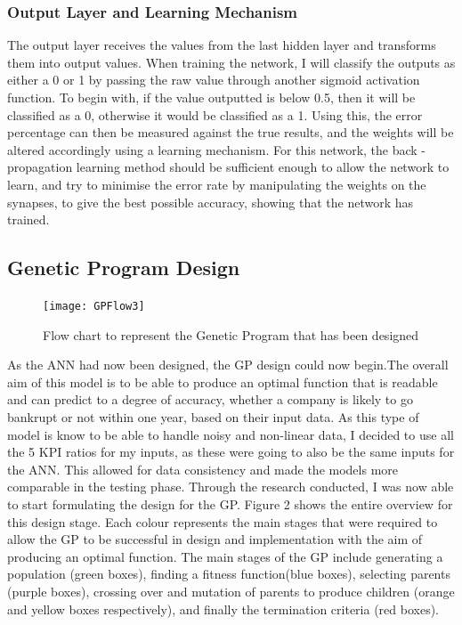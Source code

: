 \documentclass[11pt]{article}
\begin{document}
\subsubsection{Output Layer and Learning Mechanism}
The output layer receives the values from the last hidden layer and transforms them into output values. When training the network, I will classify the outputs as either a 0 or 1 by passing the raw value through another sigmoid activation function. To begin with, if the value outputted is below 0.5, then it will be classified as a 0, otherwise it would be classified as a 1. Using this, the error percentage can then be measured against the true results, and the weights will be altered accordingly using a learning mechanism. For this network, the back - propagation learning method should be sufficient enough to allow the network to learn, and try to minimise the error rate by manipulating the weights on the synapses, to give the best possible accuracy, showing that the network has trained.\\
\subsection{Genetic Program Design}
\begin{figure}[h]
\centering
\texttt{[image: GPFlow3]}
\caption{Flow chart to represent the Genetic Program that has been designed} 
\end{figure}
As the ANN had now been designed, the GP design could now begin.The overall aim of this model is to be able to produce an optimal function that is readable and can predict to a degree of accuracy, whether a company is likely to go bankrupt or not within one year, based on their input data. As this type of model is know to be able to handle noisy and non-linear data, I decided to use all the 5 KPI ratios for my inputs, as these were going to also be the same inputs for the ANN. This allowed for data consistency and made the models more comparable in the testing phase. Through the research conducted, I was now able to start formulating the design for the GP.  Figure 2 shows the entire overview for this design stage. Each colour represents the main stages that were required to allow the GP to be successful in design and implementation with the aim of producing an optimal function.  The main stages of the GP include generating a population (green boxes), finding a fitness function(blue boxes), selecting parents (purple boxes), crossing over and mutation of parents to produce children (orange and yellow boxes respectively), and finally the termination criteria (red boxes). 
\end{document}
